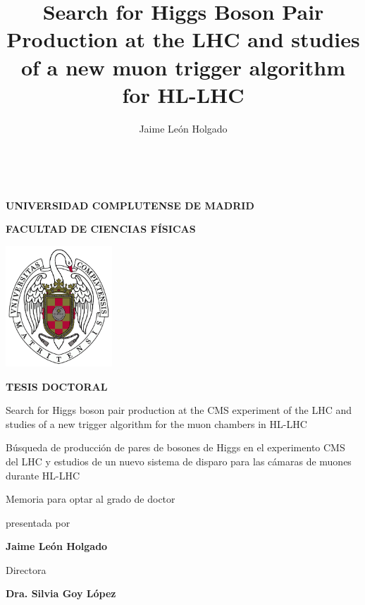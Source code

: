 \documentclass[12pt,a4paper,onehalfspacing]{book}
\author{Jaime León Holgado}
\title{Search for Higgs Boson Pair Production at the LHC and studies of a new muon trigger algorithm for HL-LHC}
\begin{document}
\pagestyle{fancy}
\fancyhead{}\fancyfoot{}
\fancyhead[RE]{\hfill\leftmark}
\fancyhead[LO]{\hfill\rightmark}
\fancyfoot[C]{\thepage}



\begin{titlepage}
\centering
	~\\
	{\Large \textbf{UNIVERSIDAD COMPLUTENSE DE MADRID }\par}
	\vspace{0.25cm}
	{\large \textbf{FACULTAD DE CIENCIAS FÍSICAS} \par}
	\vspace{1cm}
	\includegraphics[width=0.3\textwidth]{escudo_ucm.png}\par\vspace{1cm}
	{\Large \textbf{TESIS DOCTORAL} \par}
	{\Large Search for Higgs boson pair production at the CMS experiment of the LHC and studies of a new trigger algorithm for the muon chambers in HL-LHC \par}
	\vspace{0.25cm}
	{\Large Búsqueda de producción de pares de bosones de Higgs en el experimento CMS del LHC y estudios de un nuevo sistema de disparo para las cámaras de muones durante HL-LHC \par}
	\vspace{1.5cm}
	{\Large Memoria para optar al grado de doctor \par}
	{\Large presentada por \par}
	{\Large \textbf{Jaime León Holgado} \par}
	\vspace{1cm}
	{\Large Directora \par}
	{\Large \textbf{Dra. Silvia Goy López} \par}
	\vspace{2cm}

\end{titlepage}
{\let\cleardoublepage\relax \frontmatter}
\end{document}
